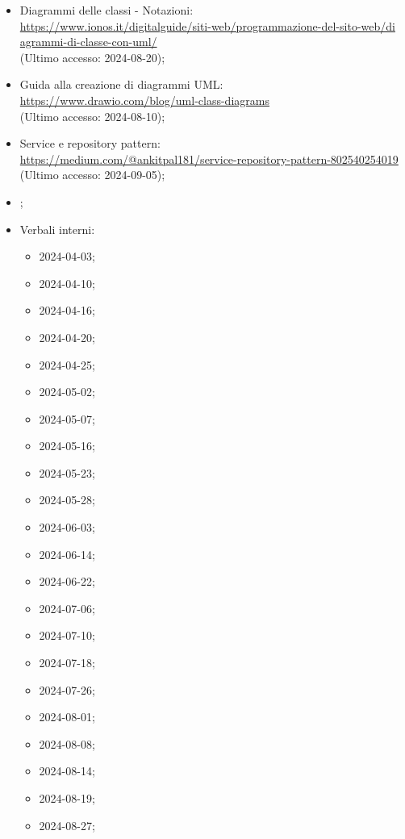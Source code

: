 \begin{itemize}
  \item Diagrammi delle classi - Notazioni:\\ \href{https://www.ionos.it/digitalguide/siti-web/programmazione-del-sito-web/diagrammi-di-classe-con-uml/}{https://www.ionos.it/digitalguide/siti-web/programmazione-del-sito-web/di \- agrammi-di-classe-con-uml/} \\ (Ultimo accesso: 2024-08-20);
  \item Guida alla creazione di diagrammi UML:\\ \href{https://www.drawio.com/blog/uml-class-diagrams}{https://www.drawio.com/blog/uml-class-diagrams} \\ (Ultimo accesso: 2024-08-10);
  \item Service e repository pattern:\\ \href{https://medium.com/@ankitpal181/service-repository-pattern-802540254019}{https://medium.com/@ankitpal181/service-repository-pattern-802540254019} \\ (Ultimo accesso: 2024-09-05);
  \item \Glossario;
  \item Verbali interni:
  \begin{itemize}
    \item 2024-04-03;
    \item 2024-04-10;
    \item 2024-04-16;
    \item 2024-04-20;
    \item 2024-04-25;
    \item 2024-05-02;
    \item 2024-05-07;
    \item 2024-05-16;
    \item 2024-05-23;
    \item 2024-05-28;
    \item 2024-06-03;
    \item 2024-06-14;
    \item 2024-06-22;
    \item 2024-07-06;
    \item 2024-07-10;
    \item 2024-07-18;
    \item 2024-07-26;
    \item 2024-08-01;
    \item 2024-08-08;
    \item 2024-08-14;
    \item 2024-08-19;
    \item 2024-08-27;

\end{itemize}
\end{itemize}
